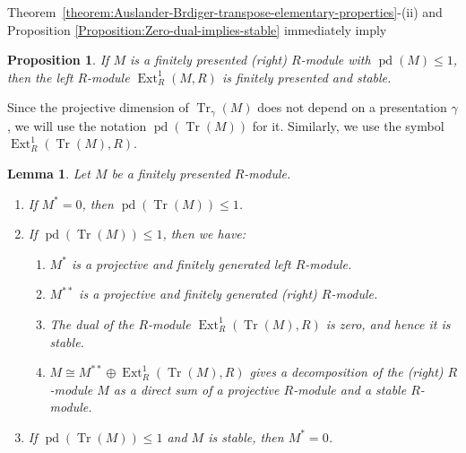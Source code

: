 \documentclass[11pt,a4paper]{amsart}
\theoremstyle{plain}
\newtheorem{lemma}[theorem]{Lemma}
\newtheorem{proposition}[theorem]{Proposition}
\theoremstyle{definition}
\theoremstyle{remark}
\newcommand{\parantezicindeenumi}[1][\roman]{\renewcommand{\theenumi}{#1{enumi}}
\renewcommand{\labelenumi}{(\theenumi)} }
\newcommand{\Ext}{\operatorname{Ext}}
\newcommand{\pd}{\operatorname{pd}}
\newcommand{\Transpose}{\operatorname{Tr}}
\begin{document}
Theorem~\ref{theorem:Auslander-Brdiger-transpose-elementary-properties}-(ii) and Proposition \ref{Proposition:Zero-dual-implies-stable} immediately imply

\begin{proposition}
\label{prop:Ext-M-R-is-stable-if-pdM-leq-1}
  If  $M$ is a \emph{finitely presented} (right) $R$-module with $\pd(M)\leq 1$, then the \emph{left} $R$-module $\Ext^1_R(M, R)$ is finitely presented and stable.
\end{proposition}


Since the projective dimension of $\Transpose_{\gamma}(M)$ does not depend on a presentation $\gamma$, we will use the notation
$\pd(\Transpose(M))$ for it. Similarly, we use the symbol  $  \Ext^1_R(\Transpose(M), R)$.


\begin{lemma}\label{theorem 3.6}
Let $M$ be a finitely presented $R$-module.
\begin{enumerate}\parantezicindeenumi
  \item If $M^*=0$, then $\pd(\Transpose(M))\leq 1$.

  \item If $\pd(\Transpose(M))\leq 1$, then we have:
  \begin{enumerate}
    \item $M^*$ is a projective and finitely generated \emph{left} $R$-module.
    \item $M^{**}$ is a projective and finitely generated (right) $R$-module.
    \item {The dual of the $R$-module $ \Ext^1_R(\Transpose(M), R)$ is zero, and hence it is stable. }

      \item $M\cong M^{**} \oplus \Ext^1_R(\Transpose(M),R)$ gives a decomposition of the (right) $R$-module $M$ as a direct sum of a projective $R$-module and a stable $R$-module.
  \end{enumerate}


  \item If $\pd(\Transpose(M))\leq 1$ \emph{and} $M$ is stable, then $M^*=0$.
\end{enumerate}
\end{lemma}
\end{document}
